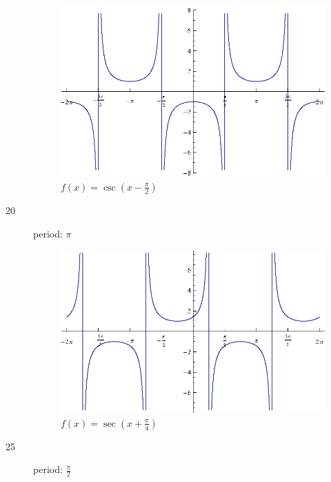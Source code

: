 \documentclass{exam}
\begin{document}
\begin{description}
        \begin{figure}[H]
          \centering
          \includegraphics[scale=0.8]{exercise19.eps}
          \caption{$f(x) = \csc \left( x - \frac{\pi}{2} \right)$}
        \end{figure}

      \item[20]
        period: $\pi$

        \begin{figure}[H]
          \centering
          \includegraphics[scale=0.8]{exercise20.eps}
          \caption{$f(x) = \sec \left( x + \frac{\pi}{4} \right)$}
        \end{figure}

      \item[25]
        period: $\frac{\pi}{2}$


\end{description}
\end{document}
